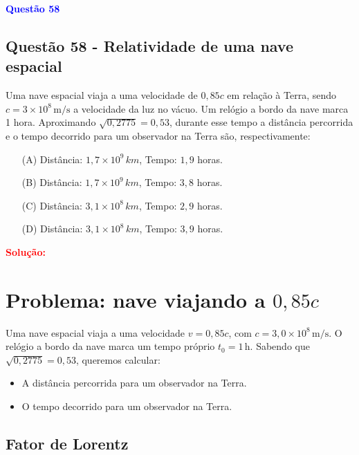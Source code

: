 \begin{flushleft}
\textbf{\textcolor{blue}{\Large Quest\~ao 58}}\\
\noindent
\subsection{Quest\~ao 58 - Relatividade de uma nave espacial}
Uma nave espacial viaja a uma velocidade de \(0{,}85c\) em relação à Terra, sendo \(c = 3 \times 10^8\, \mathrm{m/s}\) 
a velocidade da luz no vácuo. Um relógio a bordo da nave marca 1 hora. Aproximando \( \sqrt{0{,}2775} = 0{,}53 \), 
durante esse tempo a distância percorrida e o tempo decorrido para um observador na Terra são, respectivamente:


\begin{itemize}
\item[(A)] Distância: \(1{,}7 \times 10^9\, km\), Tempo: \(1{,}9\) horas.
\item[(B)] Distância: \(1{,}7 \times 10^9\, km\), Tempo: \(3{,}8\) horas.
\item[(C)] Distância: \(3{,}1 \times 10^8\, km\), Tempo: \(2{,}9\) horas.
\item[(D)] Distância: \(3{,}1 \times 10^8\, km\), Tempo: \(3{,}9\) horas.
\end{itemize}

\vspace{0.5cm}

\textcolor{red}{\textbf{Solução:}}\\

\section*{Problema: nave viajando a \(0{,}85c\)}

Uma nave espacial viaja a uma velocidade \(v = 0{,}85c\), com \(c = 3{,}0 \times 10^8\, \mathrm{m/s}\).  
O relógio a bordo da nave marca um tempo próprio \(t_0 = 1\,\mathrm{h}\).  
Sabendo que \(\sqrt{0{,}2775} = 0{,}53\), queremos calcular:

\begin{itemize}
    \item A distância percorrida para um observador na Terra.
    \item O tempo decorrido para um observador na Terra.
\end{itemize}

\subsection*{Fator de Lorentz}


\end{flushleft}

